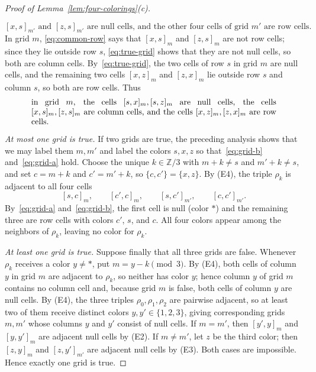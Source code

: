 \begin{proof}[Proof of Lemma~\ref{lem:four-colorings}\textup{(c)}]
\begin{itemize}
\begin{equation}\label{eq:grid-b}
\text{$[x,s]_{m'}$ and $[z,s]_{m'}$ are null cells, and the other four cells of grid $m'$ are row cells.}
\end{equation}
In grid $m$, \eqref{eq:common-row} says that $[x,s]_m$ and $[z,s]_m$ are not row cells; since they lie outside row $s$, \eqref{eq:true-grid} shows that they are not null cells, so both are column cells. By~\eqref{eq:true-grid}, the two cells of row $s$ in grid $m$ are null cells, and the remaining two cells $[x,z]_m$ and $[z,x]_m$ lie outside row $s$ and column $s$, so both are row cells. Thus
\begin{equation}\label{eq:grid-a}
\begin{minipage}{0.86\textwidth}
in grid $m$, the cells $[s,x]_m,[s,z]_m$ are null cells, the cells $[x,s]_m,[z,s]_m$ are column cells, and the cells $[x,z]_m,[z,x]_m$ are row cells.
\end{minipage}
\end{equation}
\end{itemize}

\emph{At most one grid is true.} If two grids are true, the preceding analysis shows that we may label them $m,m'$ and label the colors $s,x,z$ so that~\eqref{eq:grid-b} and~\eqref{eq:grid-a} hold. Choose the unique $k\in\mathbb Z/3$ with $m+k\ne s$ and $m'+k\ne s$, and set $c=m+k$ and $c'=m'+k$, so $\{c,c'\}=\{x,z\}$. By (E4), the triple $\rho_k$ is adjacent to all four cells
\[
 [s,c]_m,\qquad [c',c]_m,\qquad [s,c']_{m'},\qquad [c,c']_{m'}.
\]
By~\eqref{eq:grid-a} and~\eqref{eq:grid-b}, the first cell is null (color $\ast$) and the remaining three are row cells with colors $c'$, $s$, and $c$. All four colors appear among the neighbors of $\rho_k$, leaving no color for $\rho_k$.

\emph{At least one grid is true.} Suppose finally that all three grids are false. Whenever $\rho_k$ receives a color $y\ne\ast$, put $m=y-k\pmod3$. By (E4), both cells of column $y$ in grid $m$ are adjacent to $\rho_k$, so neither has color $y$; hence column $y$ of grid $m$ contains no column cell and, because grid $m$ is false, both cells of column $y$ are null cells. By (E4), the three triples $\rho_0,\rho_1,\rho_2$ are pairwise adjacent, so at least two of them receive distinct colors $y,y'\in\{1,2,3\}$, giving corresponding grids $m,m'$ whose columns $y$ and $y'$ consist of null cells. If $m=m'$, then $[y',y]_m$ and $[y,y']_m$ are adjacent null cells by (E2). If $m\ne m'$, let $z$ be the third color; then $[z,y]_m$ and $[z,y']_{m'}$ are adjacent null cells by (E3). Both cases are impossible. Hence exactly one grid is true.
\end{proof}

